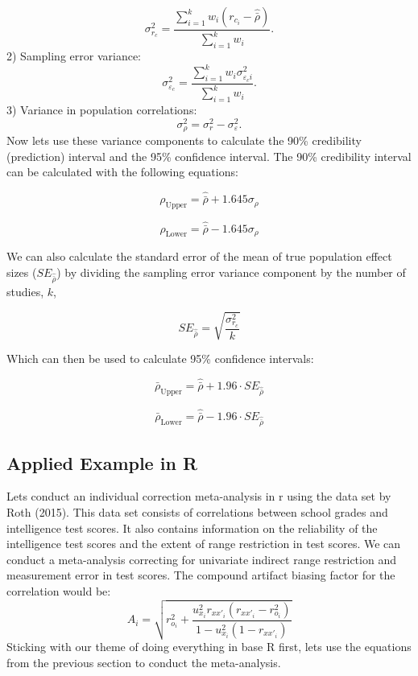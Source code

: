 \documentclass[
  letterpaper,
  DIV=11,
  numbers=noendperiod]{scrreprt}
\begin{document}
\[
\sigma^2_{r_c}=\frac{\sum^k_{i=1}w_i(r_{c_i} - \hat{\bar{\rho}})}{\sum^k_{i=1}w_i}.
\] 2) Sampling error variance: \[
\sigma^2_{\varepsilon_c} = \frac{\sum^k_{i=1}w_i\sigma^2_{\varepsilon_ci}}{\sum^k_{i=1}w_i}.
\] 3) Variance in population correlations: \[
\sigma^2_\rho = \sigma^2_r - \sigma^2_{\varepsilon}.
\] Now lets use these variance components to calculate the 90\%
credibility (prediction) interval and the 95\% confidence interval. The
90\% credibility interval can be calculated with the following
equations:

\[
\rho_\text{Upper} = \hat{\bar{\rho}} + 1.645\sigma_\rho
\]

\[
\rho_\text{Lower} = \hat{\bar{\rho}} - 1.645\sigma_\rho
\]

We can also calculate the standard error of the mean of true population
effect sizes (\(SE_{\hat{\bar{\rho}}}\)) by dividing the sampling error
variance component by the number of studies, \(k\),

\[
SE_\hat{\bar{\rho}} = \sqrt{\frac{\sigma^2_{r_c}}{k}}
\]

Which can then be used to calculate 95\% confidence intervals:

\[
\bar{\rho}_\text{Upper} = \hat{\bar{\rho}} + 1.96\cdot SE_\hat{\bar{\rho}}
\]

\[
\bar{\rho}_\text{Lower} = \hat{\bar{\rho}} - 1.96\cdot SE_\hat{\bar{\rho}}
\]

\hypertarget{applied-example-in-r}{%
\subsection{Applied Example in R}\label{applied-example-in-r}}

Lets conduct an individual correction meta-analysis in r using the data
set by Roth (2015). This data set consists of correlations between
school grades and intelligence test scores. It also contains information
on the reliability of the intelligence test scores and the extent of
range restriction in test scores. We can conduct a meta-analysis
correcting for univariate indirect range restriction and measurement
error in test scores. The compound artifact biasing factor for the
correlation would be: \[
A_i=\sqrt{r_{o_i}^2 + \frac{u_{x_i}^2 r_{xx'_i}(r_{xx'_i} - r_{o_i}^2) }{1 - u_{x_i}^2 (1-r_{xx'_i})} }
\] Sticking with our theme of doing everything in base R first, lets use
the equations from the previous section to conduct the meta-analysis.
\end{document}
